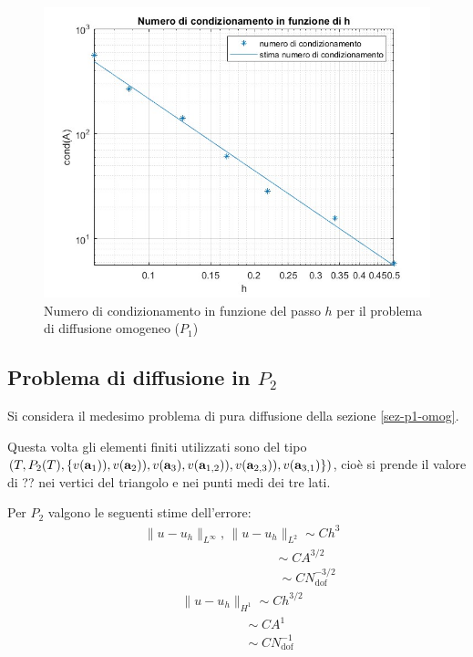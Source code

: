 \documentclass[%
	corpo=11pt,
    twoside,
    stile=classica,
    oldstyle,
    tipotesi=custom,
    greek,
    evenboxes,
]{toptesi}
\begin{document}
\begin{figure}[htbp]
  \centering
    \includegraphics[scale=0.4]{Pictures/condizionamento_p1_omog.jpg}
    \caption{Numero di condizionamento in funzione del passo $h$ per il problema di diffusione omogeneo ($P_1$)}
    \label{fig:p1_cond}
    \end{figure}



\subsection{Problema di diffusione  in $P_2$}
Si considera il medesimo problema di pura diffusione della sezione \ref{sez-p1-omog}.

Questa volta gli elementi finiti utilizzati sono del tipo $(T, P_2(T), \{v(\textbf{a}_1)),v(\textbf{a}_2)),v(\textbf{a}_3),\\v(\textbf{a}_{1,2})),v(\textbf{a}_{2,3})),v(\textbf{a}_{3,1})\})$, cioè si prende il valore di ?? nei vertici del triangolo e nei punti medi dei tre lati. 

Per $P_2$ valgono le seguenti stime dell'errore: 
\begin{align*}
&\|u - u_h\|_{L^\infty},\,\|u - u_h\|_{L^2} \sim Ch^3 \\
&\;\;\;\;\;\;\;\;\;\;\;\;\;\;\;\;\;\;\;\;\;\;\;\;\;\;\;\;\;\;\;\;\;\;\;\;\;\sim CA^{3/2} \\
&\;\;\;\;\;\;\;\;\;\;\;\;\;\;\;\;\;\;\;\;\;\;\;\;\;\;\;\;\;\;\;\;\;\;\;\;\;\;\sim CN_{\text{dof}}^{-3/2}
\end{align*}
\begin{align*}
&\|u - u_h\|_{H^1} \sim Ch^{3/2} \\
&\;\;\;\;\;\;\;\;\;\;\;\;\;\;\;\;\;\;\sim CA^{1} \\
&\;\;\;\;\;\;\;\;\;\;\;\;\;\;\;\;\;\;\sim CN_{\text{dof}}^{-1}
\end{align*}
\end{document}
